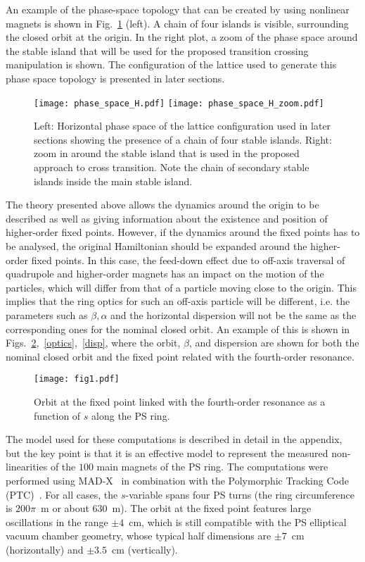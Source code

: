 \documentclass{article}
\begin{document}
An example of the phase-space topology that can be created by using nonlinear magnets is shown in Fig.~\ref{phase_space} (left). A chain of four islands is visible, surrounding the closed orbit at the origin. In the right plot, a zoom of the phase space around the stable island that will be used for the proposed transition crossing manipulation is shown. The configuration of the lattice used to generate this phase space topology is presented in later sections.
%
\begin{figure}[htb]
\centering
  \texttt{[image: phase\_space\_H.pdf]}
  \texttt{[image: phase\_space\_H\_zoom.pdf]}
  \caption{\label{phase_space} Left: Horizontal phase space of the lattice configuration used in later sections showing the presence of a chain of four stable islands. Right: zoom in around the stable island that is used in the proposed approach to cross transition. Note the chain of secondary stable islands inside the main stable island.}
\end{figure}
%

The theory presented above allows the dynamics around the origin to be described as well as giving information about the existence and position of higher-order fixed points. However, if the dynamics around the fixed points has to be analysed, the original Hamiltonian should be expanded around the higher-order fixed points. In this case, the feed-down effect due to off-axis traversal of quadrupole and higher-order magnets has an impact on the motion of the particles, which will differ from that of a particle moving close to the origin. This implies that the ring optics for such an off-axis particle will be different, i.e. the parameters such as $\beta, \alpha$ and the horizontal dispersion will not be the same as the corresponding ones for the nominal closed orbit. An example of this is shown in Figs.~\ref{fixed},~\ref{optics},~\ref{disp}, where the orbit, $\beta$, and dispersion are shown for both the nominal closed orbit and the fixed point related with the fourth-order resonance. 
%
\begin{figure}[htb]
\centering
  \texttt{[image: fig1.pdf]}
  \caption{\label{fixed} Orbit at the fixed point linked with the fourth-order resonance as a function of $s$ along the PS ring.}
\end{figure}
%
The model used for these computations is described in detail in the appendix, but the key point is that it is an effective model to represent the measured non-linearities of the $100$ main magnets of the PS ring. The computations were performed using MAD-X~\cite{MADX} in combination with the Polymorphic Tracking Code (PTC)~\cite{PTC}. For all cases, the $s$-variable spans four PS turns (the ring circumference is $200\pi$~m or about $630$~m). The orbit at the fixed point features large oscillations in the range $\pm 4$~cm, which is still compatible with the PS elliptical vacuum chamber geometry, whose typical half dimensions are $\pm 7$~cm (horizontally) and $\pm 3.5$~cm (vertically). 
\end{document}
